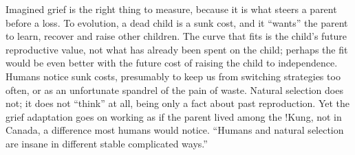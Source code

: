 Imagined grief is the right thing to measure, because it is what steers a parent before a loss. To evolution, a dead child is a sunk cost, and it ``wants'' the parent to learn, recover and raise other children.  The curve that fits is the child's future reproductive value, not what has already been spent on the child; perhaps the fit would be even better with the future cost of raising the child to independence. Humans notice sunk costs, presumably to keep us from switching strategies too often, or as an unfortunate spandrel of the pain of waste. Natural selection does not; it does not ``think'' at all, being only a fact about past reproduction. Yet the grief adaptation goes on working as if the parent lived among the !Kung, not in Canada, a difference most humans would notice. ``Humans and natural selection are insane in different stable complicated ways.''

